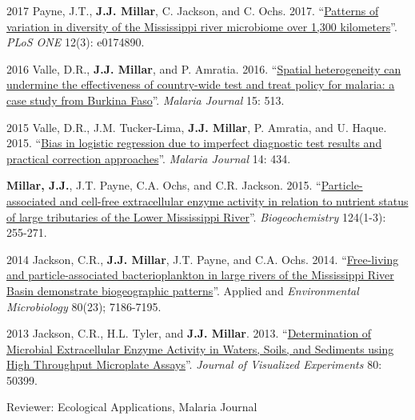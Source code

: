 \begin{cvskills}
\cvskill
    {2017} %
    {Payne, J.T., \textbf{J.J. Millar}, C. Jackson, and C. Ochs. 2017. “\href{http://journals.plos.org/plosone/article?id=10.1371/journal.pone.0174890}{Patterns of variation in diversity of the Mississippi river microbiome over 1,300 kilometers}”. \textit{PLoS ONE} 12(3): e0174890.} 


\cvskill
    {2016} %
    {Valle, D.R., \textbf{J.J. Millar}, and P. Amratia. 2016. “\href{https://malariajournal.biomedcentral.com/articles/10.1186/s12936-016-1565-2}{Spatial heterogeneity can undermine the effectiveness of country-wide test and treat policy for malaria: a case study from Burkina Faso}”. \textit{Malaria Journal} 15: 513.} 


\cvskill
    {2015} %
    {Valle, D.R., J.M. Tucker-Lima, \textbf{J.J. Millar}, P. Amratia, and U. Haque. 2015. “\href{https://malariajournal.biomedcentral.com/articles/10.1186/s12936-015-0966-y}{Bias in logistic regression due to imperfect diagnostic test results and practical correction approaches}”. \textit{Malaria Journal} 14: 434.
    } 
    
\cvskill
    {} %
    {\textbf{Millar, J.J.}, J.T. Payne, C.A. Ochs, and C.R. Jackson. 2015. “\href{http://aem.asm.org/content/early/2014/09/08/AEM.01844-14}{Particle-associated and cell-free extracellular enzyme activity in relation to nutrient status of large tributaries of the Lower Mississippi River}”. \textit{Biogeochemistry} 124(1-3): 255-271.
    } 

\cvskill
    {2014} %
    {Jackson, C.R., \textbf{J.J. Millar}, J.T. Payne, and C.A. Ochs. 2014. “\href{http://aem.asm.org/content/early/2014/09/08/AEM.01844-14}{Free-living and particle-associated bacterioplankton in large rivers of the Mississippi River Basin demonstrate biogeographic patterns}”. Applied and \textit{Environmental Microbiology} 80(23); 7186-7195.
    } 

\cvskill
    {2013} %
    {Jackson, C.R., H.L. Tyler, and \textbf{J.J. Millar}. 2013. “\href{https://www.jove.com/video/50399/determination-microbial-extracellular-enzyme-activity-waters-soils}{Determination of Microbial Extracellular Enzyme Activity in Waters, Soils, and Sediments using High Throughput Microplate Assays}”. \textit{Journal of Visualized Experiments} 80: 50399.
    } 




\end{cvskills}

{Reviewer: Ecological Applications, Malaria Journal}
\\
\\